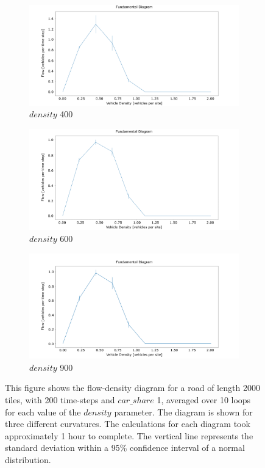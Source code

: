 \begin{figure}
     \centering
    \begin{subfigure}[b]{0.75\textwidth}
        \centering
        \includegraphics[width=\textwidth]{images/flow_density401_car_only.png}
        \caption{$density$ 400}
    \end{subfigure}
    \begin{subfigure}[b]{0.75\textwidth}
        \centering
        \includegraphics[width=\textwidth]{images/flow_density601_car_only.png}
        \caption{$density$ 600}
    \end{subfigure}
    \begin{subfigure}[b]{0.75\textwidth}
        \centering
        \includegraphics[width=\textwidth]{images/flow_density901_car_only.png}
        \caption{$density$ 900}
    \end{subfigure}
    \caption{This figure shows the flow-density diagram for a road of length 2000 tiles, with 200 time-steps and $car\_share$ 1, averaged over 10 loops for each value of the $density$ parameter. The diagram is shown for three different curvatures. The calculations for each diagram took approximately 1 hour to complete. The vertical line represents the standard deviation within a 95\% confidence interval of a normal distribution.}
    \label{fig:flow_density901_car_only}
\end{figure}

